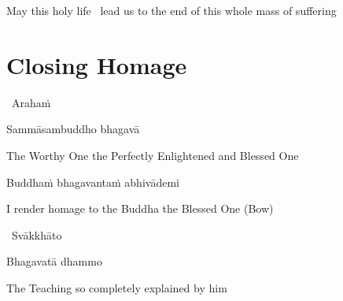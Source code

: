 \begin{english-hang}
  May this holy life \breathmark\ lead us to the end of this whole mass of suffering
\end{english-hang}

\suttaRef{[Thai]}

\ifdigital{}\fi



\section{Closing Homage}
\label{closing-homage}

\ifninebythirteen
  \vspace{-0.1cm}
\fi

\begin{leader}
  \anglebracketleft\ \hspace{-0.5mm}Arahaṁ \hspace{-0.5mm}\anglebracketright\
\end{leader}

\ifninebythirteen
  \vspace{-0.25cm}
\else
  \vspace{-0.5cm}
\fi

Sammāsambuddho bhagavā

\begin{english-hang}
  The Worthy One the Perfectly Enlightened and Blessed One
\end{english-hang}

Buddhaṁ bhagavantaṁ abhivādemi

\begin{english}
  I render homage to the Buddha the Blessed One \hfill{\textnormal{\ifafive\fontsize{12.5}{18}\fi\ifninebythirteen\fontsize{9}{13}\fi\selectfont (Bow)}}
\end{english}

\begin{leader}
  \anglebracketleft\ \hspace{-0.5mm}Svākkhāto \hspace{-0.5mm}\anglebracketright\
\end{leader}

\ifninebythirteen
  \vspace{-0.25cm}
\else
  \vspace{-0.5cm}
\fi

Bhagavatā dhammo

\begin{english}
  The Teaching so completely explained by him
\end{english}

